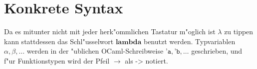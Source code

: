 \section{Konkrete Syntax}

Da es mitunter nicht mit jeder herk"ommlichen Tastatur m"oglich ist $\lambda$ zu tippen kann stattdessen das
Schl"usselwort $\textbf{lambda}$ benutzt werden. Typvariablen $\alpha,\beta,\ldots$ werden in der "ublichen
OCaml-Schreibweise $\texttt{'a}, \texttt{'b},\ldots$ geschrieben, und f"ur Funktionstypen wird der Pfeil
$\to$ als $\texttt{->}$ notiert.



